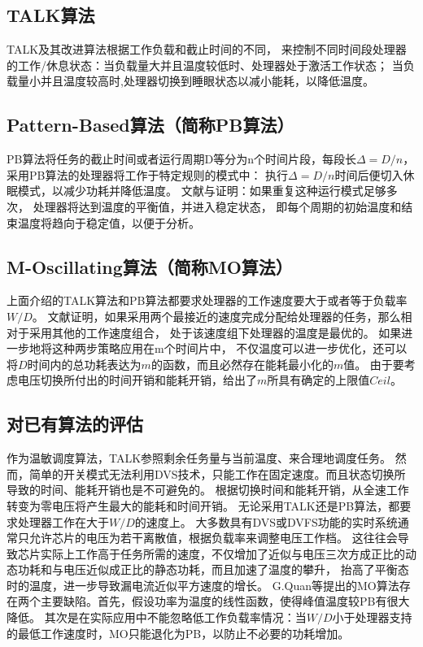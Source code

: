 \subsection{TALK算法}
TALK及其改进算法根据工作负载和截止时间的不同， 来控制不同时间段处理器的工作/休息状态：当负载量大并且温度较低时、处理器处于激活工作状态； 当负载量小并且温度较高时,处理器切换到睡眼状态以减小能耗，以降低温度。

\subsection{Pattern-Based算法（简称PB算法）}

PB算法将任务的截止时间或者运行周期D等分为n个时间片段，每段长$\Delta=D/n$， 采用PB算法的处理器将工作于特定规则的模式中： 执行$\Delta=D/n$时间后便切入休眠模式，以减少功耗并降低温度。 文献与证明：如果重复这种运行模式足够多次， 处理器将达到温度的平衡值，并进入稳定状态， 即每个周期的初始温度和结束温度将趋向于稳定值，以便于分析。

\subsection{M-Oscillating算法（简称MO算法）}

上面介绍的TALK算法和PB算法都要求处理器的工作速度要大于或者等于负载率$W/D$。 文献证明，如果采用两个最接近的速度完成分配给处理器的任务，那么相对于采用其他的工作速度组合， 处于该速度组下处理器的温度是最优的。 如果进一步地将这种两步策略应用在m个时间片中， 不仅温度可以进一步优化，还可以将$D$时间内的总功耗表达为$m$的函数，而且必然存在能耗最小化的$m$值。 由于要考虑电压切换所付出的时间开销和能耗开销，给出了$m$所具有确定的上限值$Ceil$。

\subsection{对已有算法的评估}
作为温敏调度算法，TALK参照剩余任务量与当前温度、来合理地调度任务。 然而，简单的开关模式无法利用DVS技术，只能工作在固定速度。而且状态切换所导致的时间、能耗开销也是不可避免的。 根据切换时间和能耗开销，从全速工作转变为零电压将产生最大的能耗和时间开销。
无论采用TALK还是PB算法，都要求处理器工作在大于$W/D$的速度上。 大多数具有DVS或DVFS功能的实时系统通常只允许芯片的电压为若干离散值，根据负载率来调整电压工作档。 这往往会导致芯片实际上工作高于任务所需的速度，不仅增加了近似与电压三次方成正比的动态功耗和与电压近似成正比的静态功耗，而且加速了温度的攀升， 抬高了平衡态时的温度，进一步导致漏电流近似平方速度的增长。
G.Quan等提出的MO算法存在两个主要缺陷。首先，假设功率为温度的线性函数，使得峰值温度较PB有很大降低。 其次是在实际应用中不能忽略低工作负载率情况：当$W/D$小于处理器支持的最低工作速度时，MO只能退化为PB，以防止不必要的功耗增加。

